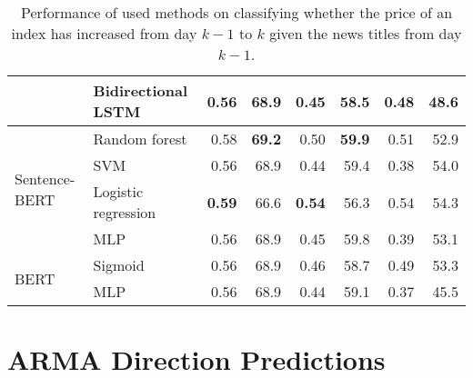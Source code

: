 \begin{table}[H]
\begin{tabular}{llrrrrrr}
        & Bidirectional LSTM & 0.56 & 68.9 & 0.45 & 58.5 & 0.48 & 48.6 \\
        \hline 
        \multirow{4}{*}{Sentence-BERT} & Random forest & 0.58 & \textbf{69.2} & 0.50 & \textbf{59.9} & 0.51 & 52.9 \\
        & SVM & 0.56 & 68.9 & 0.44 & 59.4 & 0.38 & 54.0  \\
        & Logistic regression & \textbf{0.59} & 66.6 & \textbf{0.54} & 56.3 & 0.54 & 54.3  \\
        & MLP & 0.56 & 68.9 & 0.45 & 59.8 & 0.39 & 53.1 \\
        \hline
        \multirow{2}{*}{BERT} & Sigmoid & 0.56 & 68.9 & 0.46 & 58.7 & 0.49 & 53.3 \\
        & MLP & 0.56 & 68.9 & 0.44 & 59.1 & 0.37 & 45.5 \\ 
        \hline
    \end{tabular}
\caption{Performance of used methods on classifying whether the price of an index has increased from day $k-1$ to $k$ given the news titles from day $k-1$.}
\label{tab:resndp}
\end{table}

\section{ARMA Direction Predictions}\label{sec:res_arma}


